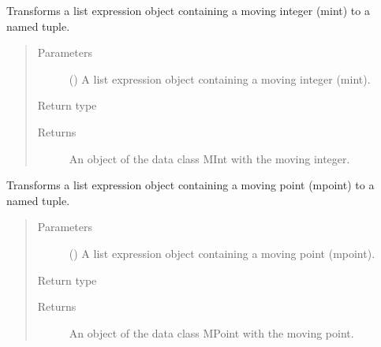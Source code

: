 \documentclass[letterpaper,10pt,english]{sphinxmanual}
\begin{document}

\begin{fulllineitems}
\label{\detokenize{index:secondodb.api.algebras.secondospatiotemporalalgebra.parse_mint}}
Transforms a list expression object containing a moving integer (mint) to a named tuple.
\begin{quote}\begin{description}
\item[{Parameters}] \leavevmode
{} () \textendash{} A list expression object containing a moving integer (mint).

\item[{Return type}] \leavevmode
{\hyperref[\detokenize{index:secondodb.api.algebras.secondospatiotemporalalgebra.MInt}]{}}

\item[{Returns}] \leavevmode
An object of the data class MInt with the moving integer.

\end{description}\end{quote}

\end{fulllineitems}


\begin{fulllineitems}
\label{\detokenize{index:secondodb.api.algebras.secondospatiotemporalalgebra.parse_mpoint}}
Transforms a list expression object containing a moving point (mpoint) to a named tuple.
\begin{quote}\begin{description}
\item[{Parameters}] \leavevmode
{} () \textendash{} A list expression object containing a moving point (mpoint).

\item[{Return type}] \leavevmode
{\hyperref[\detokenize{index:secondodb.api.algebras.secondospatiotemporalalgebra.MPoint}]{}}

\item[{Returns}] \leavevmode
An object of the data class MPoint with the moving point.

\end{description}\end{quote}

\end{fulllineitems}
\end{document}
